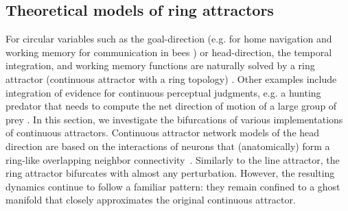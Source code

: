 \documentclass{article} %
\newcounter{ct}
\theoremstyle{definition}
\theoremstyle{remark}
\begin{document}
\subsection{Theoretical models of ring attractors}\label{sec:ras}

For circular variables such as the goal-direction (e.g. for home navigation and working memory for communication	 in bees \citep{frisch1993dance}) %
or head-direction, the temporal integration, and working memory functions are naturally solved by a ring attractor (continuous attractor with a ring topology) \citep{kim2017ring,kim2019generation,turner2017angular,turner2020neuroanatomical,hulse2020mechanisms,taube2003persistent,taube2007head,angelaki2020head,fisher2022flexible}.
Other examples include
integration of evidence for continuous perceptual judgments, e.g. a hunting predator that needs to compute the net direction of motion of a large group of prey \citep{esnaola2022flexible}.
In this section, we investigate the bifurcations of various implementations of continuous attractors.
Continuous attractor network models of the head direction are based on the interactions of neurons that (anatomically) form a ring-like overlapping neighbor connectivity~\citep{zhang1996,Noorman2022,ajabi2023,vafidis2022,boucheny2005continuous,knierim2012,song2005angular,xie2002double}.
Similarly to the line attractor, the ring attractor bifurcates with almost any perturbation. However, the resulting dynamics continue to follow a familiar pattern: they remain confined to a ghost manifold that closely approximates the original continuous attractor.
\end{document}
